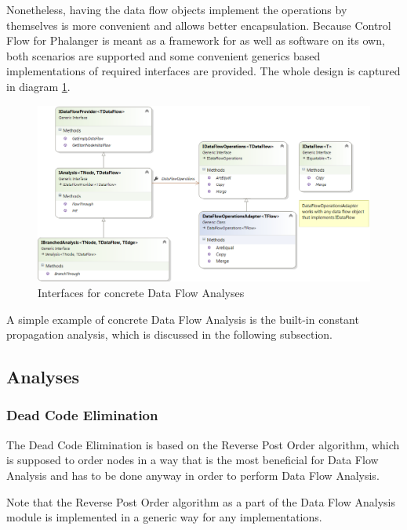         Nonetheless, having the data flow objects implement the operations by 
        themselves is more convenient and allows better encapsulation. 
        Because Control Flow for Phalanger is meant as a framework for as 
        well as software on its own, both scenarios are supported and 
        some convenient generics based implementations of required 
        interfaces are provided. The whole design is captured in 
        diagram \ref{dataflowifaces}.
        
\begin{figure}[h]  
  \centering
    \includegraphics*[width=\textwidth,height=\textheight,keepaspectratio]{img/dataflow-ifaces.png}  
    \caption{Interfaces for concrete Data Flow Analyses\label{dataflowifaces}}
\end{figure}

        A simple example of concrete Data Flow Analysis is the built-in 
        constant propagation analysis, which is discussed in the 
        following subsection.        
    
    \subsection{Analyses}
        \subsubsection*{Dead Code Elimination}
        
        The Dead Code Elimination is based on the Reverse Post Order 
        algorithm, which is supposed to order nodes in a way that 
        is the most beneficial for Data Flow Analysis and has to be 
        done anyway in order to perform Data Flow Analysis.
        
        Note that the Reverse Post Order algorithm as a part 
        of the Data Flow Analysis module is implemented 
        in a generic way for any  implementations. 
        
